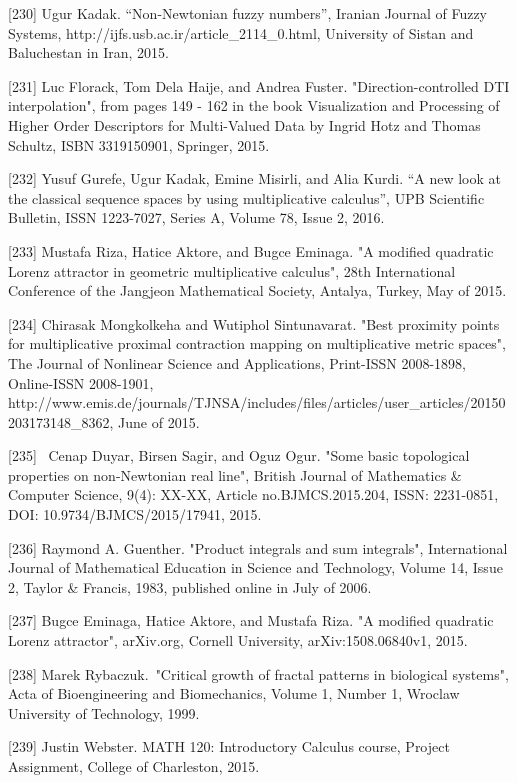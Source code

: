 \documentclass[12pt]{article}
\begin{document}
[230] Ugur Kadak. “Non-Newtonian fuzzy numbers”, Iranian Journal of Fuzzy Systems, http://ijfs.usb.ac.ir/article_2114_0.html, University of Sistan and Baluchestan in Iran, 2015.

[231] Luc Florack, Tom Dela Haije, and Andrea Fuster. "Direction-controlled DTI interpolation", from pages 149 - 162 in the book Visualization and Processing of Higher Order Descriptors for Multi-Valued Data by Ingrid Hotz and Thomas Schultz, ISBN 3319150901, Springer, 2015.

[232] Yusuf Gurefe, Ugur Kadak, Emine Misirli, and Alia Kurdi. “A new look at the classical sequence spaces by using multiplicative calculus”, UPB Scientific Bulletin, ISSN 1223-7027, Series A, Volume 78, Issue 2, 2016.

[233] Mustafa Riza, Hatice Aktore, and Bugce Eminaga. "A modified quadratic Lorenz attractor in geometric multiplicative calculus", 28th International Conference of the Jangjeon Mathematical Society, Antalya, Turkey, May of 2015.

[234] Chirasak Mongkolkeha and Wutiphol Sintunavarat. "Best proximity points for multiplicative proximal contraction mapping on multiplicative metric spaces", The Journal of Nonlinear Science and Applications, Print-ISSN 2008-1898, Online-ISSN 2008-1901, http://www.emis.de/journals/TJNSA/includes/files/articles/user_articles/20150203173148_8362, June of 2015.

[235]  Cenap Duyar, Birsen Sagir, and Oguz Ogur. "Some basic topological properties on non-Newtonian real line", British Journal of Mathematics & Computer Science, 9(4): XX-XX, Article no.BJMCS.2015.204, ISSN: 2231-0851, DOI: 10.9734/BJMCS/2015/17941, 2015.

[236] Raymond A. Guenther. "Product integrals and sum integrals", International Journal of Mathematical Education in Science and Technology, Volume 14, Issue 2, Taylor & Francis, 1983, published online in July of 2006.

[237] Bugce Eminaga, Hatice Aktore, and Mustafa Riza. "A modified quadratic Lorenz attractor", arXiv.org, Cornell University, arXiv:1508.06840v1, 2015.

[238] Marek Rybaczuk. "Critical growth of fractal patterns in biological systems", Acta of Bioengineering and Biomechanics, Volume 1, Number 1, Wroclaw University of Technology, 1999.

[239] Justin Webster. MATH 120: Introductory Calculus course, Project Assignment, College of Charleston, 2015.
\end{document}

